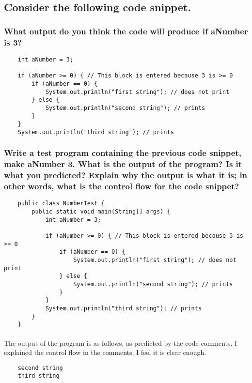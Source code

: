 \documentclass{article}
\begin{document}
    \subsection{Consider the following code snippet.}
    \subsubsection{What output do you think the code will produce if aNumber is 3?}
    \begin{verbatim}
    int aNumber = 3;

    if (aNumber >= 0) { // This block is entered because 3 is >= 0
        if (aNumber == 0) { 
            System.out.println("first string"); // does not print
        } else { 
            System.out.println("second string"); // prints
        }
    } 
    System.out.println("third string"); // prints
    \end{verbatim}

    \subsubsection{Write a test program containing the previous code snippet, make aNumber 3. What is the output of the program? Is it what you predicted? Explain why the output is what it is; in other words, what is the control flow for the code snippet?}

    \begin{verbatim}
    public class NumberTest {
        public static void main(String[] args) {
            int aNumber = 3;

            if (aNumber >= 0) { // This block is entered because 3 is >= 0
                if (aNumber == 0) { 
                    System.out.println("first string"); // does not print
                } else { 
                    System.out.println("second string"); // prints
                }
            } 
            System.out.println("third string"); // prints
        }
    }
    \end{verbatim}

    \paragraph{}
    The output of the program is as follows, as predicted by the code comments. I explained the control flow in the comments, I feel it is clear enough.

    \begin{verbatim}
    second string
    third string
    \end{verbatim}
\end{document}
